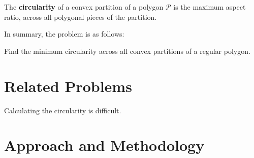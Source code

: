 \documentclass[11pt]{article}
\begin{document}
\begin{definition}[Circularity]
The \textbf{circularity} of a convex partition of a polygon $\mathcal{P}$ is the maximum aspect ratio, across all polygonal pieces of the partition.
\end{definition}

In summary, the problem is as follows:
\begin{goal*}Find the minimum circularity across all convex partitions of a regular polygon.
\end{goal*}

\section{Related Problems}

Calculating the circularity is difficult. 

\section{Approach and Methodology}
\end{document}

